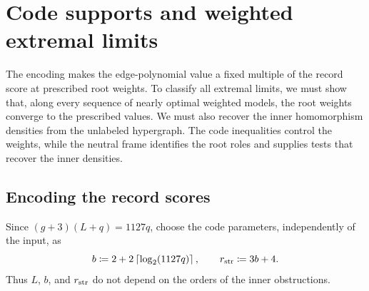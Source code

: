 \documentclass[10pt]{article}
\numberwithin{equation}{section}
\theoremstyle{definition}
\begin{document}
\section{Code supports and weighted extremal limits}\label{sec:weighted}
The encoding makes the edge-polynomial value a fixed multiple of the record score at prescribed root weights. To classify all extremal limits, we must show that, along every sequence of nearly optimal weighted models, the root weights converge to the prescribed values. We must also recover the inner homomorphism densities from the unlabeled hypergraph. The code inequalities control the weights, while the neutral frame identifies the root roles and supplies tests that recover the inner densities.

\subsection{Encoding the record scores}
Since $(g+3)(L+q)=1127q$, choose the code parameters, independently of the input, as
\[
 b\coloneqq2+2\left\lceil\log_2(1127q)\right\rceil,
 \qquad r_{\rm str}\coloneqq3b+4.
\]
Thus $L$, $b$, and $r_{\rm str}$ do not depend on the orders of the inner obstructions.
\end{document}
